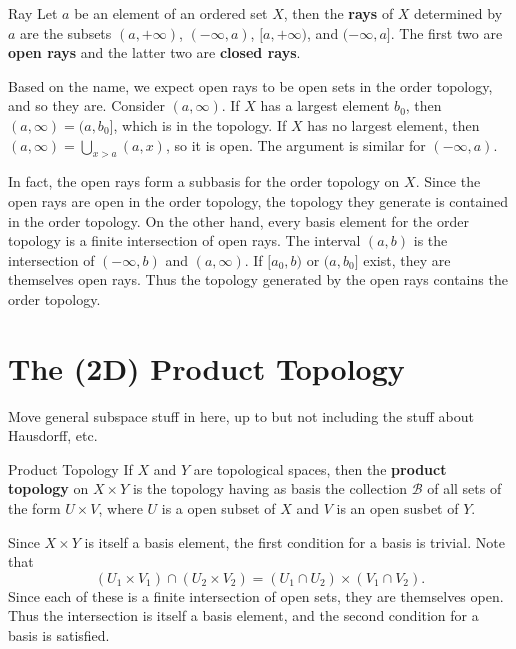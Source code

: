 \documentclass[10pt]{report}
\begin{document}
\begin{defn}{Ray}{}
	Let $a$ be an element of an ordered set $X$, then the \textbf{rays} of $X$ determined by $a$ are the subsets $(a,+\infty)$, $(-\infty,a)$, $[a,+\infty)$, and $(-\infty,a]$. The first two are \textbf{open rays} and the latter two are \textbf{closed rays}. 
\end{defn}

Based on the name, we expect open rays to be open sets in the order topology, and so they are. Consider $(a,\infty)$. If $X$ has a largest element $b_0$, then $(a,\infty)=(a,b_0]$, which is in the topology. If $X$ has no largest element, then $(a,\infty) = \bigcup_{x>a}(a,x)$, so it is open. The argument is similar for $(-\infty,a)$.

In fact, the open rays form a subbasis for the order topology on $X$. Since the open rays are open in the order topology, the topology they generate is contained in the order topology. On the other hand, every basis element for the order topology is a finite intersection of open rays. The interval $(a,b)$ is the intersection of $(-\infty,b)$ and $(a,\infty)$. If $[a_0,b)$ or $(a,b_0]$ exist, they are themselves open rays. Thus the topology generated by the open rays contains the order topology.



\section{The (2D) Product Topology}

{\color{red}Move general subspace stuff in here, up to but not including the stuff about Hausdorff, etc.}

\begin{defn}{Product Topology}{}
If $X$ and $Y$ are topological spaces, then the \textbf{product topology} on $X \times Y$ is the topology having as basis the collection $\mathcal{B}$ of all sets of the form $U \times V$, where $ U$ is a open subset of $X$ and $V$ is an open susbet of $Y$.
\end{defn}

Since $X \times Y$ is itself a basis element, the first condition for a basis is trivial. Note that \[
	(U_1 \times V_1) \cap (U_2 \times V_2) = (U_1 \cap U_2) \times (V_1 \cap V_2).
\] Since each of these is a finite intersection of open sets, they are themselves open. Thus the intersection is itself a basis element, and the second condition for a basis is satisfied.
\end{document}
